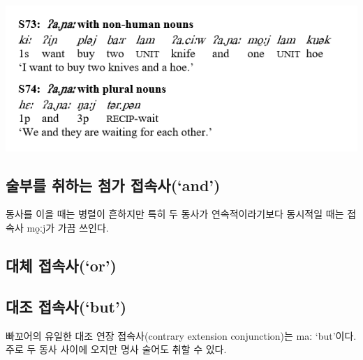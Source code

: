\includegraphics{Pacoh/src/PacohS73.png}

\subsection{술부를 취하는 첨가 접속사(`and')}
동사를 이을 때는 병렬이 흔하지만 특히 두 동사가 연속적이라기보다 동시적일 때는 접속사 mo̰ːj가 가끔 쓰인다.

\subsection{대체 접속사(`or')}
\omission

\subsection{대조 접속사(`but')}
빠꼬어의 유일한 대조 연장 접속사(contrary extension conjunction)는 maː `but'이다. 주로 두 동사 사이에 오지만 명사 술어도 취할 수 있다.